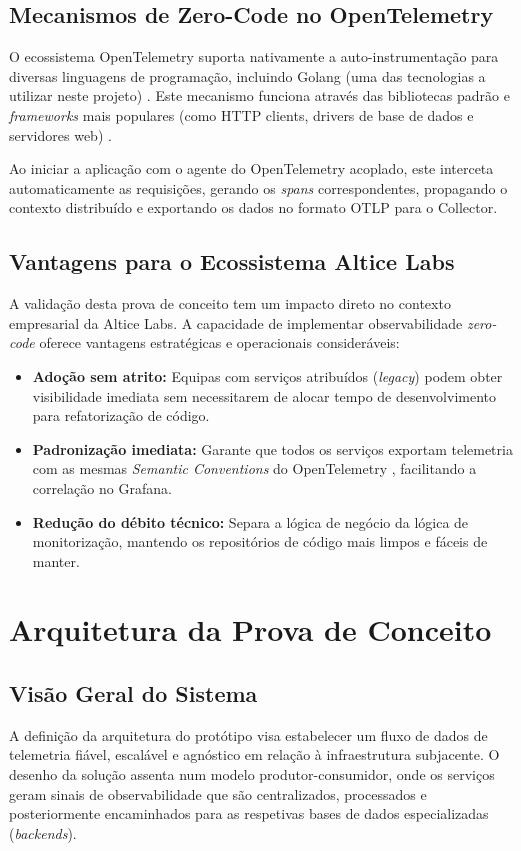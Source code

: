 \documentclass[a4paper,12pt,oneside]{article}
\begin{document}
    \subsection{Mecanismos de Zero-Code no OpenTelemetry}
        O ecossistema OpenTelemetry suporta nativamente a auto-instrumentação para diversas linguagens de programação, incluindo Golang (uma das tecnologias a utilizar neste projeto) \cite{otel_go_zerocode}. Este mecanismo funciona através das bibliotecas padrão e \textit{frameworks} mais populares (como HTTP clients, drivers de base de dados e servidores web) \cite{otel_go_instr}.
        
        Ao iniciar a aplicação com o agente do OpenTelemetry acoplado, este interceta automaticamente as requisições, gerando os \textit{spans} correspondentes, propagando o contexto distribuído e exportando os dados no formato OTLP para o Collector.

    \subsection{Vantagens para o Ecossistema Altice Labs}
        A validação desta prova de conceito tem um impacto direto no contexto empresarial da Altice Labs. A capacidade de implementar observabilidade \textit{zero-code} oferece vantagens estratégicas e operacionais consideráveis:
        \begin{itemize}
            \item \textbf{Adoção sem atrito:} Equipas com serviços atribuídos (\textit{legacy}) podem obter visibilidade imediata sem necessitarem de alocar tempo de desenvolvimento para refatorização de código.
            \item \textbf{Padronização imediata:} Garante que todos os serviços exportam telemetria com as mesmas \textit{Semantic Conventions} do OpenTelemetry \cite{otel_docs}, facilitando a correlação no Grafana.
            \item \textbf{Redução do débito técnico:} Separa a lógica de negócio da lógica de monitorização, mantendo os repositórios de código mais limpos e fáceis de manter.
        \end{itemize}

\section{Arquitetura da Prova de Conceito}
    \subsection{Visão Geral do Sistema}
        A definição da arquitetura do protótipo visa estabelecer um fluxo de dados de telemetria fiável, escalável e agnóstico em relação à infraestrutura subjacente. O desenho da solução assenta num modelo produtor-consumidor, onde os serviços geram sinais de observabilidade que são centralizados, processados e posteriormente encaminhados para as respetivas bases de dados especializadas (\textit{backends}).
\end{document}
